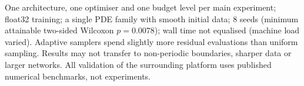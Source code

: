 One architecture, one optimiser and one budget level per main experiment; float32 training; a single PDE family
with smooth initial data; 8 seeds (minimum attainable two-sided Wilcoxon $p=0.0078$); wall time not equalised
(machine load varied). Adaptive samplers spend slightly more residual evaluations than uniform sampling. Results may
not transfer to non-periodic boundaries, sharper data or larger networks. All validation of the surrounding platform
uses published numerical benchmarks, not experiments.
